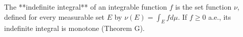 The **indefinite integral** of an integrable function $f$ is the set function $\nu$, defined for every measurable set $E$ by $\nu(E) = \int_E f d\mu$. If $f \geq 0$ a.e., its indefinite integral is monotone (Theorem G).
